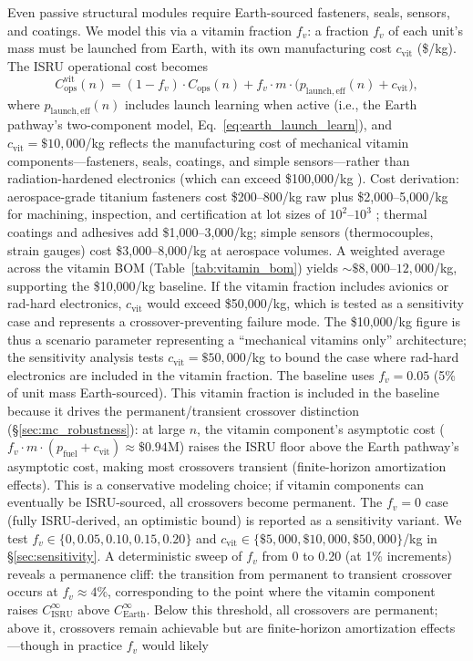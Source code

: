 \documentclass[preprint,12pt]{elsarticle}
\begin{document}
Even passive structural modules require Earth-sourced fasteners, seals, sensors, and coatings. We model this via a vitamin fraction $f_v$: a fraction $f_v$ of each unit's mass must be launched from Earth, with its own manufacturing cost $c_{\mathrm{vit}}$ (\$/kg). The ISRU operational cost becomes
\begin{equation}
  C_{\mathrm{ops}}^{\mathrm{vit}}(n) = (1 - f_v) \cdot C_{\mathrm{ops}}(n) + f_v \cdot m \cdot \bigl(p_{\mathrm{launch,eff}}(n) + c_{\mathrm{vit}}\bigr),
  \label{eq:vitamin}
\end{equation}
where $p_{\mathrm{launch,eff}}(n)$ includes launch learning when active (i.e., the Earth pathway's two-component model, Eq.~\ref{eq:earth_launch_learn}), and $c_{\mathrm{vit}} = \$10{,}000$/kg reflects the manufacturing cost of mechanical vitamin components---fasteners, seals, coatings, and simple sensors---rather than radiation-hardened electronics (which can exceed \$100{,}000/kg \cite{wertz2011}). Cost derivation: aerospace-grade titanium fasteners cost \$200--800/kg raw plus \$2{,}000--5{,}000/kg for machining, inspection, and certification at lot sizes of $10^2$--$10^3$ \cite{wertz2011}; thermal coatings and adhesives add \$1{,}000--3{,}000/kg; simple sensors (thermocouples, strain gauges) cost \$3{,}000--8{,}000/kg at aerospace volumes. A weighted average across the vitamin BOM (Table~\ref{tab:vitamin_bom}) yields ${\sim}\$8{,}000$--$12{,}000$/kg, supporting the \$10{,}000/kg baseline. If the vitamin fraction includes avionics or rad-hard electronics, $c_{\mathrm{vit}}$ would exceed \$50{,}000/kg, which is tested as a sensitivity case and represents a crossover-preventing failure mode. The \$10{,}000/kg figure is thus a scenario parameter representing a ``mechanical vitamins only'' architecture; the sensitivity analysis tests $c_{\mathrm{vit}} = \$50{,}000$/kg to bound the case where rad-hard electronics are included in the vitamin fraction. The baseline uses $f_v = 0.05$ (5\% of unit mass Earth-sourced). This vitamin fraction is included in the baseline because it drives the permanent/transient crossover distinction (\S\ref{sec:mc_robustness}): at large $n$, the vitamin component's asymptotic cost ($f_v \cdot m \cdot (p_{\mathrm{fuel}} + c_{\mathrm{vit}}) \approx \$0.94$M) raises the ISRU floor above the Earth pathway's asymptotic cost, making most crossovers transient (finite-horizon amortization effects). This is a conservative modeling choice; if vitamin components can eventually be ISRU-sourced, all crossovers become permanent. The $f_v = 0$ case (fully ISRU-derived, an optimistic bound) is reported as a sensitivity variant. We test $f_v \in \{0, 0.05, 0.10, 0.15, 0.20\}$ and $c_{\mathrm{vit}} \in \{\$5{,}000, \$10{,}000, \$50{,}000\}$/kg in \S\ref{sec:sensitivity}. A deterministic sweep of $f_v$ from 0 to 0.20 (at 1\% increments) reveals a permanence cliff: the transition from permanent to transient crossover occurs at $f_v \approx 4\%$, corresponding to the point where the vitamin component raises $C_{\mathrm{ISRU}}^{\infty}$ above $C_{\mathrm{Earth}}^{\infty}$. Below this threshold, all crossovers are permanent; above it, crossovers remain achievable but are finite-horizon amortization effects---though in practice $f_v$ would likely 
\end{document}
